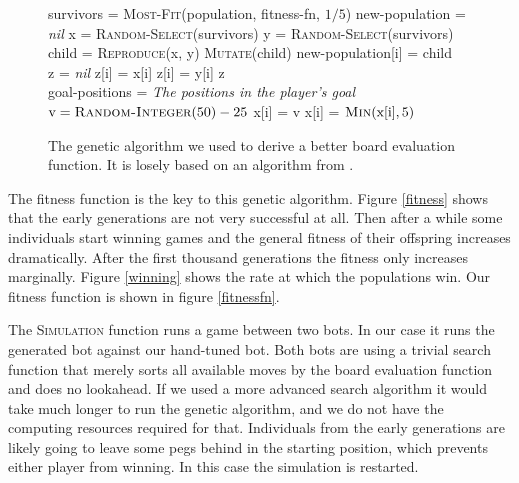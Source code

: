 \documentclass[a4paper,11pt]{article}
\begin{document}
\begin{figure}
\begin{algorithmic}
\While{$\top$}
 \State survivors = \textsc{Most-Fit}(population, fitness-fn, $1/5$)
 \State new-population = \emph{nil}
   \State x = \textsc{Random-Select}(survivors)
   \State y = \textsc{Random-Select}(survivors)
   \State child = \textsc{Reproduce}(x, y)
     \State \textsc{Mutate}(child)
   \EndIf
   \State new-population[i] = child
 \EndFor
\EndWhile
\EndFunction
\\
\State z = \emph{nil}
  \State z[i] = x[i]
 \Else
  \State z[i] = y[i]
 \EndIf
\EndFor
\State \Return z
\EndFunction
\\
\State goal-positions = \emph{The positions in the player's goal}
  \State $\textrm{v} = \textsc{Random-Integer}(50) - 25$
    \State x[i] = v
  \EndIf
 \EndIf
\EndFor
{}
 \State x[i] = $\textsc{Min}(\textrm{x}[\textrm{i}], 5)$
\EndFor
\EndFunction
\end{algorithmic}

\caption{The genetic algorithm we used to derive a better board
  evaluation function. It is losely based on an algorithm from
  \cite{aimodern}.}
\label{genalg}
\end{figure}

The fitness function is the key to this genetic algorithm. Figure
\ref{fitness} shows that the early generations are not very successful
at all. Then after a while some individuals start winning games and
the general fitness of their offspring increases dramatically. After
the first thousand generations the fitness only increases marginally.
Figure \ref{winning} shows the rate at which the populations win. Our
fitness function is shown in figure \ref{fitnessfn}.

The \textsc{Simulation} function runs a game between two bots. In our
case it runs the generated bot against our hand-tuned bot. Both bots
are using a trivial search function that merely sorts all available
moves by the board evaluation function and does no lookahead. If we
used a more advanced search algorithm it would take much longer to run
the genetic algorithm, and we do not have the computing resources
required for that. Individuals from the early generations are likely
going to leave some pegs behind in the starting position, which
prevents either player from winning. In this case the simulation is
restarted.
\end{document}
